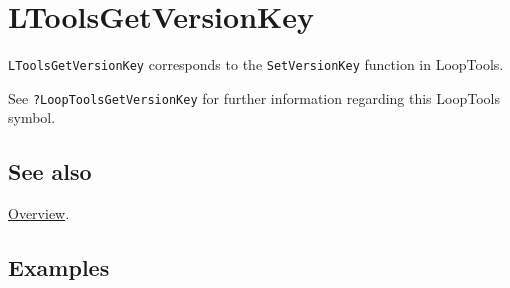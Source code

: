 \documentclass[../FeynHelpersManual.tex]{subfiles}
\begin{document}
\hypertarget{ltoolsgetversionkey}{
\section{LToolsGetVersionKey}\label{ltoolsgetversionkey}}

\texttt{LToolsGetVersionKey} corresponds to the \texttt{SetVersionKey}
function in LoopTools.

See \texttt{?LoopTools\textasciigrave GetVersionKey} for further
information regarding this LoopTools symbol.

\subsection{See also}

\hyperlink{toc}{Overview}.

\subsection{Examples}
\end{document}
